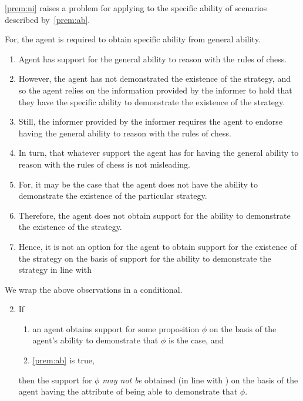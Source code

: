 \begin{note}
  \ref{prem:ni} raises a problem for applying \AR{} to the specific ability of scenarios described by~\ref{prem:ab}.

  For, the agent is required to obtain specific ability from general ability.
  \begin{enumerate}
  \item Agent has support for the general ability to reason with the rules of chess.
  \item However, the agent has not demonstrated the existence of the strategy, and so the agent relies on the information provided by the informer to hold that they have the specific ability to demonstrate the existence of the strategy.
  \item Still, the informer provided by the informer requires the agent to endorse having the general ability to reason with the rules of chess.
  \item In turn, that whatever support the agent has for having the general ability to reason with the rules of chess is not misleading.
  \item For, it may be the case that the agent does not have the ability to demonstrate the existence of the particular strategy.
  \item Therefore, the agent does not obtain support for the ability to demonstrate the existence of the strategy.
  \item Hence, it is not an option for the agent to obtain support for the existence of the strategy on the basis of support for the ability to demonstrate the strategy in line with \AR{}
  \end{enumerate}
\end{note}

\begin{note}
  We wrap the above observations in a conditional.
  \begin{enumerate}[label=(C\arabic*), ref=(C\arabic*)]
    \setcounter{enumi}{1}
  \item\label{P:ab-and-dc:A} If
    \begin{enumerate}[label=(C2\alph*), ref=(C2\alph*)]
    \item an agent obtains support for some proposition \(\phi\) on the basis of the agent's ability to demonstrate that \(\phi\) is the case, and
    \item \ref{prem:ab} is true,
    \end{enumerate}
    then the support for \(\phi\) \emph{may not be} obtained (in line with \AR{}) on the basis of the agent having the attribute of being able to demonstrate that \(\phi\).
  \end{enumerate}
\end{note}

